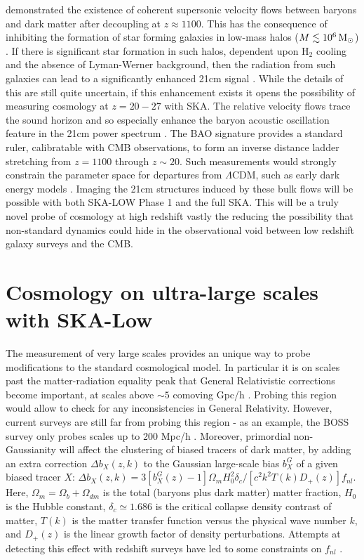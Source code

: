 \documentclass{PoS}
\newcommand{\om}{\Omega_m}
\newcommand{\ob}{\Omega_b}
\newcommand{\odm}{\Omega_{dm}}
\newcommand{\ho}{H_0}
\newcommand{\fnl}{f_{nl}}
\begin{document}
\cite{2010PhRvD..82h3520T} demonstrated the existence of coherent supersonic velocity flows between baryons and dark matter after decoupling at $z\approx1100$. This has the consequence of inhibiting the formation of star forming galaxies in low-mass halos ($M\lesssim10^6{\rm\,M_\odot}$) \citep[e.g.][]{2011MNRAS.412L..40M,2011ApJ...730L...1S}. If there is significant star formation in such halos, dependent upon H$_2$ cooling and the absence of Lyman-Werner background, then the radiation from such galaxies can lead to a significantly enhanced 21cm signal \citep{2012Natur.487...70V,2014MNRAS.437L..36F,2012ApJ...760....3M}. While the details of this are still quite uncertain, if this enhancement exists it opens the possibility of measuring cosmology at $z=20-27$ with SKA. The relative velocity flows trace the sound horizon and so especially enhance the baryon acoustic oscillation feature in the 21cm power spectrum \citep[see e.g.][]{2012ApJ...760....3M}. The BAO signature provides a standard ruler, calibratable with CMB observations, to form an inverse distance ladder stretching from $z=1100$ through $z\sim20$. Such measurements would strongly constrain the parameter space for departures from $\Lambda$CDM, such as early dark energy models \citep[e.g.][]{2006A&A...454...27B,2006JCAP...06..026D}. Imaging the 21cm structures induced by these bulk flows will be possible with both SKA-LOW Phase 1 and the full SKA. This will be a truly novel probe of cosmology at high redshift vastly the reducing the possibility that non-standard dynamics could hide in the observational void between low redshift galaxy surveys and the CMB.

\section{Cosmology on ultra-large scales with SKA-Low}

The measurement of very large scales provides an unique way to probe modifications to the standard cosmological model. In particular it is on scales past the matter-radiation equality peak that General Relativistic corrections become important, at scales above $\sim 5$ comoving Gpc/h \citep{2012PhRvD..85b3504J}. Probing this region would allow to check for any inconsistencies in General Relativity. However, current surveys are still far from probing this region - as an example, the BOSS survey only probes scales up to 200 Mpc/h \citep{2012MNRAS.427.3435A}.
Moreover, primordial non-Gaussianity will affect the clustering of biased tracers of dark matter, by adding an extra correction $\Delta b_X(z,k)$ to the Gaussian large-scale bias $b_X^G$ of a given biased tracer $X$: $\Delta b_X(z,k)=3[b_X^G(z)-1]\om\ho^2\delta_c/[c^2k^2T(k)D_+(z)]\fnl$. Here, $\om=\ob+\odm$ is the total (baryons plus dark matter) matter fraction, $\ho$ is the Hubble constant, $\delta_c\simeq1.686$ is the critical collapse density contrast of matter, $T(k)$ is the matter transfer function versus the physical wave number $k$, and $D_+(z)$ is the linear growth factor of density perturbations. Attempts at detecting this effect with redshift surveys have led to some constraints on $\fnl$ \citep{2014PhRvD..89b3511G}.
\end{document}
